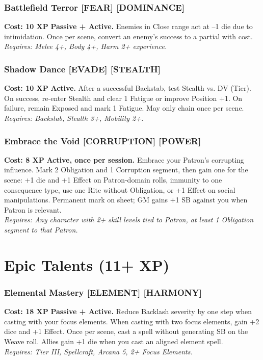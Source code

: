 \subsubsection*{Battlefield Terror \textnormal{[FEAR] [DOMINANCE]}}
\label{talent:battlefield-terror}
\textbf{Cost: 10 XP} \textbf{Passive + Active.} Enemies in Close range act at –1 die due to intimidation. Once per scene, convert an enemy's success to a partial with cost. \\
\textit{Requires: Melee 4+, Body 4+, Harm 2+ experience.}

\subsubsection*{Shadow Dance \textnormal{[EVADE] [STEALTH]}}
\label{talent:shadow-dance}
\textbf{Cost: 10 XP} \textbf{Active.} After a successful Backstab, test Stealth vs. DV (Tier). On success, re-enter Stealth and clear 1 Fatigue or improve Position +1. On failure, remain Exposed and mark 1 Fatigue. May only chain once per scene. \\
\textit{Requires: Backstab, Stealth 3+, Mobility 2+.}

\subsubsection*{Embrace the Void \textnormal{[CORRUPTION] [POWER]}}
\label{talent:embrace-the-void}
\textbf{Cost: 8 XP} \textbf{Active, once per session.} Embrace your Patron's corrupting influence. Mark 2 Obligation and 1 Corruption segment, then gain one for the scene: +1 die and +1 Effect on Patron-domain rolls, immunity to one consequence type, use one Rite without Obligation, or +1 Effect on social manipulations. Permanent mark on sheet; GM gains +1 SB against you when Patron is relevant. \\
\textit{Requires: Any character with 2+ skill levels tied to Patron, at least 1 Obligation segment to that Patron.}

\section{Epic Talents (11+ XP)}
\label{sec:epic-talents}

\subsubsection*{Elemental Mastery \textnormal{[ELEMENT] [HARMONY]}}
\label{talent:elemental-mastery}
\textbf{Cost: 18 XP} \textbf{Passive + Active.} Reduce Backlash severity by one step when casting with your focus elements. When casting with two focus elements, gain +2 dice and +1 Effect. Once per scene, cast a spell without generating SB on the Weave roll. Allies gain +1 die when you cast an aligned element spell. \\
\textit{Requires: Tier III, Spellcraft, Arcana 5, 2+ Focus Elements.}

